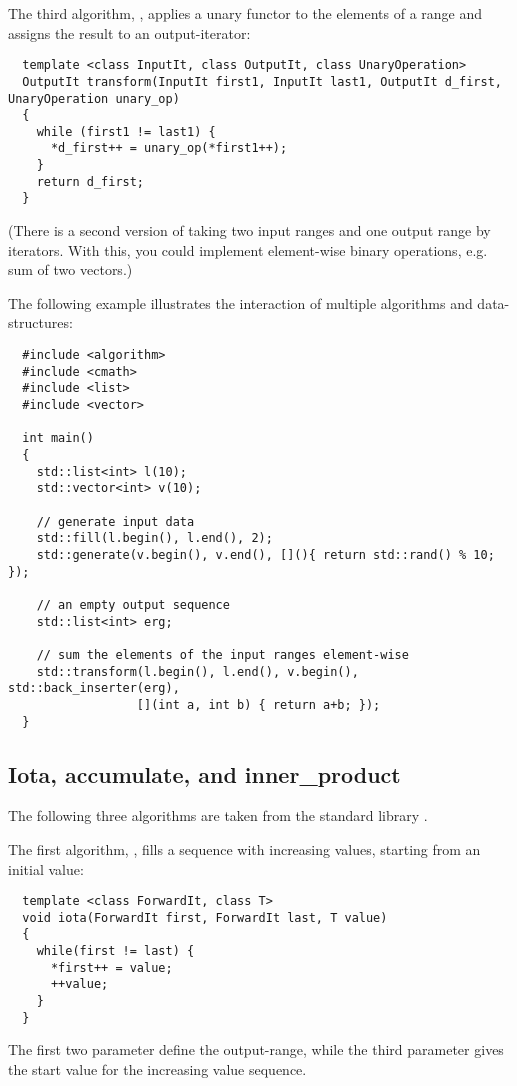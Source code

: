 The third algorithm, , applies a unary functor to the elements of a range and assigns the result to an output-iterator:
%
\begin{samepage}
\begin{verbatim}
  template <class InputIt, class OutputIt, class UnaryOperation>
  OutputIt transform(InputIt first1, InputIt last1, OutputIt d_first, UnaryOperation unary_op)
  {
    while (first1 != last1) {
      *d_first++ = unary_op(*first1++);
    }
    return d_first;
  }
\end{verbatim}
\end{samepage}
(There is a second version of  taking two input ranges and one output range by iterators. With this, you could implement element-wise
binary operations, e.g. sum of two vectors.)

\begin{example}
  The following example illustrates the interaction of multiple algorithms and data-structures:
  \begin{verbatim}
  #include <algorithm>
  #include <cmath>
  #include <list>
  #include <vector>

  int main()
  {
    std::list<int> l(10);
    std::vector<int> v(10);

    // generate input data
    std::fill(l.begin(), l.end(), 2);
    std::generate(v.begin(), v.end(), [](){ return std::rand() % 10; });

    // an empty output sequence
    std::list<int> erg;

    // sum the elements of the input ranges element-wise
    std::transform(l.begin(), l.end(), v.begin(), std::back_inserter(erg),
                  [](int a, int b) { return a+b; });
  }
  \end{verbatim}
\end{example}


\subsection{Iota, accumulate, and inner\_product}
The following three algorithms are taken from the standard library .

The first algorithm, , fills a sequence with increasing values, starting from an initial value:
%
\begin{samepage}
\begin{verbatim}
  template <class ForwardIt, class T>
  void iota(ForwardIt first, ForwardIt last, T value)
  {
    while(first != last) {
      *first++ = value;
      ++value;
    }
  }
\end{verbatim}
\end{samepage}
%
The first two parameter define the output-range, while the third parameter gives the start value for the increasing value sequence.

